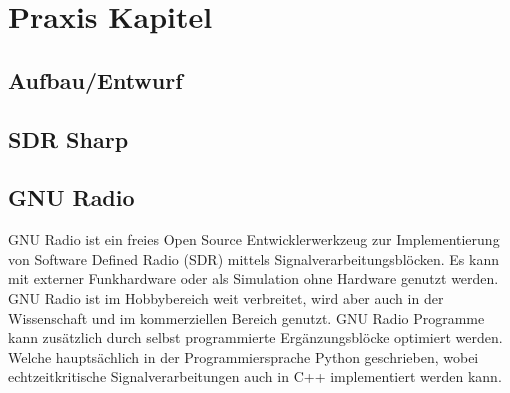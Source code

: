 
\chapter{Praxis Kapitel}
\section{Aufbau/Entwurf}
\section{SDR Sharp}

\section{GNU Radio}
GNU  Radio  ist  ein  freies  Open  Source  Entwicklerwerkzeug  zur  Implementierung von Software Defined Radio (SDR) mittels Signalverarbeitungsblöcken. Es kann mit externer Funkhardware oder als Simulation ohne Hardware genutzt werden. GNU Radio ist im Hobbybereich weit verbreitet, wird aber auch in der Wissenschaft und im kommerziellen Bereich genutzt. GNU Radio Programme kann zusätzlich  durch selbst programmierte Ergänzungsblöcke optimiert werden. Welche hauptsächlich in der Programmiersprache Python geschrieben, wobei echtzeitkritische Signalverarbeitungen auch in C++ implementiert werden kann.
